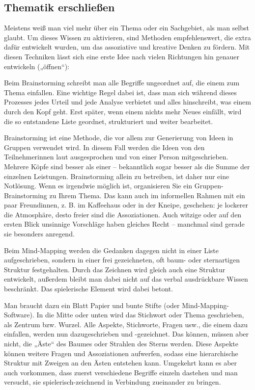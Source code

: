 \documentclass[]{book}
\theoremstyle{definition}
\theoremstyle{definition}
\theoremstyle{definition}
\theoremstyle{remark}
\begin{document}
\hypertarget{thematik-erschliessen}{\subsection{Thematik
erschließen}\label{thematik-erschliessen}}

Meistens weiß man viel mehr über ein Thema oder ein Sachgebiet, als man
selbst glaubt. Um dieses Wissen zu aktivieren, sind Methoden
empfehlenswert, die extra dafür entwickelt wurden, um das assoziative
und kreative Denken zu fördern. Mit diesen Techniken lässt sich eine
erste Idee nach vielen Richtungen hin genauer entwickeln („öffnen``):

Beim Brainstorming schreibt man alle Begriffe ungeordnet auf, die einem
zum Thema einfallen. Eine wichtige Regel dabei ist, dass man sich
während dieses Prozesses jedes Urteil und jede Analyse verbietet und
alles hinschreibt, was einem durch den Kopf geht. Erst später, wenn
einem nichts mehr Neues einfällt, wird die so entstandene Liste
geordnet, strukturiert und weiter bearbeitet.

Brainstorming ist eine Methode, die vor allem zur Generierung von Ideen
in Gruppen verwendet wird. In diesem Fall werden die Ideen von den
Teilnehmerinnen laut ausgesprochen und von einer Person mitgeschrieben.
Mehrere Köpfe sind besser als einer -- bekanntlich sogar besser als die
Summe der einzelnen Leistungen. Brainstorming allein zu betreiben, ist
daher nur eine Notlösung. Wenn es irgendwie möglich ist, organisieren
Sie ein Gruppen-Brainstorming zu Ihrem Thema. Das kann auch im
informellen Rahmen mit ein paar Freundinnen, z. B. im Kaffeehaus oder in
der Kneipe, geschehen: je lockerer die Atmosphäre, desto freier sind die
Assoziationen. Auch witzige oder auf den ersten Blick unsinnige
Vorschläge haben gleiches Recht -- manchmal sind gerade sie besonders
anregend.

Beim Mind-Mapping werden die Gedanken dagegen nicht in einer Liste
aufgeschrieben, sondern in einer frei gezeichneten, oft baum- oder
sternartigen Struktur festgehalten. Durch das Zeichnen wird gleich auch
eine Struktur entwickelt, außerdem bleibt man dabei nicht auf das verbal
ausdrückbare Wissen beschränkt. Das spielerische Element wird dabei
betont.

Man braucht dazu ein Blatt Papier und bunte Stifte (oder
Mind-Mapping-Software). In die Mitte oder unten wird das Stichwort oder
Thema geschrieben, als Zentrum bzw. Wurzel. Alle Aspekte, Stichworte,
Fragen usw., die einem dazu einfallen, werden nun dazugeschrieben und
-gezeichnet. Das können, müssen aber nicht, die „Äste`` des Baumes oder
Strahlen des Sterns werden. Diese Aspekte können weitere Fragen und
Assoziationen aufwerfen, sodass eine hierarchische Struktur mit Zweigen
an den Ästen entstehen kann. Umgekehrt kann es aber auch vorkommen, dass
zuerst verschiedene Begriffe einzeln dastehen und man versucht, sie
spielerisch-zeichnend in Verbindung zueinander zu bringen.
\end{document}
